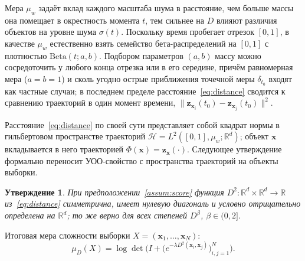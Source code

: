 \documentclass[14pt, a4paper]{extarticle}
\theoremstyle{definition}
\theoremstyle{plain}
\newtheorem{proposition}[definition]{Утверждение}
\begin{document}
Мера $\mu_w$ задаёт вклад каждого масштаба шума в расстояние, чем больше массы она
помещает в окрестность момента $t$, тем сильнее на $D$ влияют различия объектов на
уровне шума $\sigma(t)$. Поскольку
время пробегает отрезок $[0,1]$, в качестве $\mu_w$ естественно взять семейство бета-распределений на
$[0,1]$ с плотностью $\mathrm{Beta}(t;a,b)$. Подбором
параметров $(a,b)$ массу можно сосредоточить у любого конца отрезка или в его
середине, причём равномерная мера ($a=b=1$) и сколь угодно острые приближения
точечной меры $\delta_{t_0}$ входят как частные случаи; в последнем пределе
расстояние~\eqref{eq:distance} сводится к сравнению траекторий в один момент
времени, $\|\mathbf{z}_{\mathbf{x}_i}(t_0)-\mathbf{z}_{\mathbf{x}_j}(t_0)\|^2$.

Расстояние~\eqref{eq:distance} по своей сути представляет собой квадрат нормы в гильбертовом пространстве траекторий $\mathcal{H}=L^2([0,1],\mu_w;\mathbb{R}^d)$; объект
$\mathbf{x}$ вкладывается в него траекторией
$\Phi(\mathbf{x})=\mathbf{z}_{\mathbf{x}}(\cdot)$. Следующее утверждение
формально переносит УОО-свойство с пространства траекторий на объекты выборки.

\begin{proposition}
\label{prop:dcnd}
При предположении~\ref{assum:score} функция
$D^2:\mathbb{R}^d\times\mathbb{R}^d\to\mathbb{R}$
из~\eqref{eq:distance} симметрична, имеет нулевую диагональ и условно
отрицательно определена на $\mathbb{R}^d$; то же верно для всех степеней
$D^{\beta}$, $\beta\in(0,2]$.
\end{proposition}


Итоговая мера сложности выборки $X=(\mathbf{x}_1,\dots,\mathbf{x}_N)$:
\begin{equation}
    \mu_D(X)
    =\log\det\Big(I+\big(e^{-\lambda D^2(\mathbf{x}_i,\mathbf{x}_j)}\big)_{i,j=1}^{N}\Big).
    \label{eq:final}
\end{equation}
\end{document}
